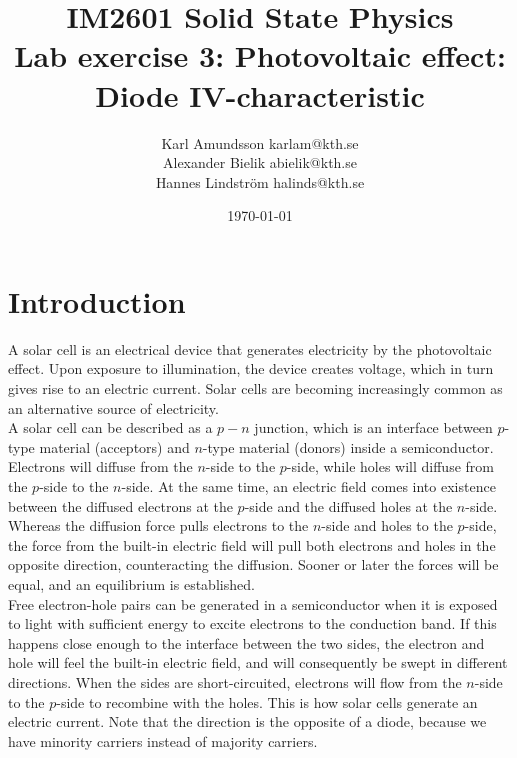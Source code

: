 \documentclass[12pt,a4paper]{article}
\title{IM2601 Solid State Physics \\ Lab exercise 3: Photovoltaic effect: Diode IV-characteristic}
\author{Karl Amundsson karlam@kth.se\\
Alexander Bielik abielik@kth.se\\
Hannes Lindström halinds@kth.se}
\date{\today}
\begin{document}
\maketitle
\thispagestyle{empty}

\newpage

\tableofcontents
\thispagestyle{empty}

\newpage
\setcounter{page}{1}


\section{Introduction}

A solar cell is an electrical device that generates electricity by the photovoltaic effect. Upon exposure to illumination, the device creates voltage, which in turn gives rise to an electric current. Solar cells are becoming increasingly common as an alternative source of electricity. \\

A solar cell can be described as a $p-n$ junction, which is an interface between $p$-type material (acceptors) and $n$-type material (donors) inside a semiconductor. Electrons will diffuse from the $n$-side to the $p$-side, while holes will diffuse from the $p$-side to the $n$-side. At the same time, an electric field comes into existence between the diffused electrons at the $p$-side and the diffused holes at the $n$-side. Whereas the diffusion force pulls electrons to the $n$-side and holes to the $p$-side, the force from the built-in electric field will pull both electrons and holes in the opposite direction, counteracting the diffusion. Sooner or later the forces will be equal, and an equilibrium is established. \\


Free electron-hole pairs can be generated in a semiconductor when it is exposed to light with sufficient energy to excite electrons to the conduction band. If this happens close enough to the interface between the two sides, the electron and hole will feel the built-in electric field, and will consequently be swept in different directions. When the sides are short-circuited, electrons will flow from the $n$-side to the $p$-side to recombine with the holes. This is how solar cells generate an electric current. Note that the direction is the opposite of a diode, because we have minority carriers instead of majority carriers.
\end{document}
